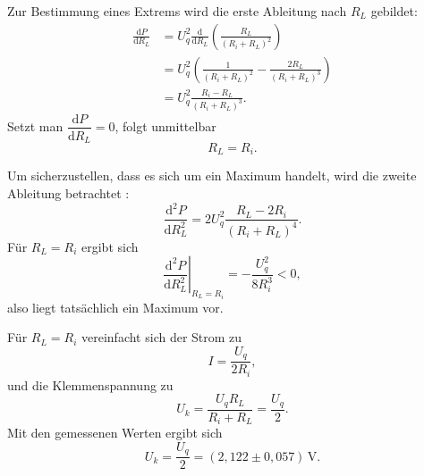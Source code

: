 Zur Bestimmung eines Extrems wird die erste Ableitung nach \(R_L\) gebildet:
\begin{align*}
    \frac{\mathrm{d}P}{\mathrm{d}R_L}
    &=U_q^2\frac{\mathrm{d}}{\mathrm{d}R_L}\left(\frac{R_L}{(R_i+R_L)^2}\right)\\
    &=U_q^2\left(\frac{1}{(R_i+R_L)^2}-\frac{2R_L}{(R_i+R_L)^3}\right)\\
    &=U_q^2\frac{R_i-R_L}{(R_i+R_L)^3}.
\end{align*}
Setzt man \(\dfrac{\mathrm{d}P}{\mathrm{d}R_L}=0\), folgt unmittelbar
\begin{equation}
    R_L=R_i.
\end{equation}

Um sicherzustellen, dass es sich um ein Maximum handelt, wird die zweite Ableitung betrachtet   :
\begin{equation}
    \frac{\mathrm{d}^2P}{\mathrm{d}R_L^2}
    =2U_q^2\frac{R_L-2R_i}{(R_i+R_L)^4}.
\end{equation}
Für \(R_L=R_i\) ergibt sich
\begin{equation}
    \left.\frac{\mathrm{d}^2P}{\mathrm{d}R_L^2}\right|_{R_L=R_i}
    =-\frac{U_q^2}{8R_i^3}<0,
\end{equation}
also liegt tatsächlich ein Maximum vor.

Für \(R_L=R_i\) vereinfacht sich der Strom zu
\begin{equation}
    I=\frac{U_q}{2R_i},
\end{equation}
und die Klemmenspannung zu
\begin{equation}
    U_k=\frac{U_q R_L}{R_i+R_L}=\frac{U_q}{2}.
\end{equation}
Mit den gemessenen Werten ergibt sich
\begin{equation}
    \boxed{
        U_k=\frac{U_q}{2}=(2,122\pm 0,057)\,\mathrm{V}
    }.
\end{equation}